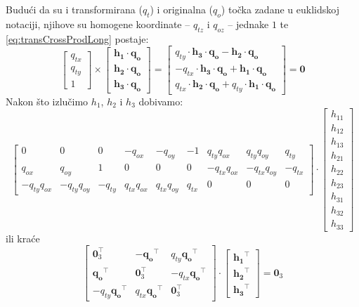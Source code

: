 Budući da su i transformirana ($q_t$) i originalna ($q_o$) točka zadane u euklidskoj notaciji, njihove su homogene koordinate -- $q_{tz}$ i $q_{oz}$ -- jednake $1$ te \eqref{eq:transCrossProdLong} postaje:
\begin{equation}
\label{eq:transCrossProdDetailed}
\left[
\begin{matrix}
q_{tx} \\
q_{ty} \\
1
\end{matrix}
\right]
\times \left[
\begin{matrix}
\mathbf{h_1} \cdot \mathbf{q_o} \\
\mathbf{h_2} \cdot \mathbf{q_o} \\
\mathbf{h_3} \cdot \mathbf{q_o}
\end{matrix}
\right]
= \left[
\begin{matrix}
q_{ty} \cdot \mathbf{h_3} \cdot \mathbf{q_o} - \mathbf{h_2} \cdot \mathbf{q_o} \\
-q_{tx} \cdot \mathbf{h_3} \cdot \mathbf{q_o} + \mathbf{h_1} \cdot \mathbf{q_o} \\
q_{tx} \cdot \mathbf{h_2} \cdot \mathbf{q_o} + q_{ty} \cdot \mathbf{h_1} \cdot \mathbf{q_o}
\end{matrix}
\right]
= \mathbf{0}
\end{equation}
Nakon što izlučimo $h_1$, $h_2$ i $h_3$ dobivamo:
\begin{equation}
\left[
\begin{matrix}
0 & 0 & 0 & -q_{ox} & -q_{oy} & -1 & q_{ty} q_{ox} & q_{ty} q_{oy} & q_{ty} \\
q_{ox} & q_{oy} & 1 & 0 & 0 & 0 & -q_{tx} q_{ox} & -q_{tx} q_{oy} & -q_{tx} \\
-q_{ty} q_{ox} & -q_{ty} q_{oy} & -q_{ty} & q_{tx} q_{ox} & q_{tx} q_{oy} & q_{tx} & 0 & 0 & 0
\end{matrix}
\right]
\cdot
\left[
\begin{matrix}
h_{11} \\
h_{12} \\
h_{13} \\
h_{21} \\
h_{22} \\
h_{23} \\
h_{31} \\
h_{32} \\
h_{33}
\end{matrix}
\right]
\end{equation}
ili kraće
\begin{equation}
\left[
\begin{matrix}
\mathbf{0}_3^\top & -\mathbf{q_o}^\top & q_{ty} \mathbf{q_o}^\top \\
\mathbf{q_o}^\top & \mathbf{0}_3^\top & -q_{tx} \mathbf{q_o}^\top \\
-q_{ty}\mathbf{q_o}^\top & q_{tx} \mathbf{q_o}^\top & \mathbf{0}_3^\top
\end{matrix}
\right]
\cdot
\left[
\begin{matrix}
\mathbf{h_1}^\top \\
\mathbf{h_2}^\top \\
\mathbf{h_3}^\top
\end{matrix}
\right]
= \mathbf{0}_3
\end{equation}

